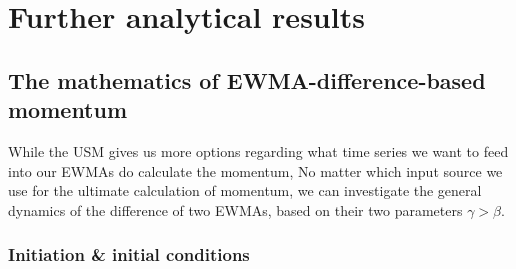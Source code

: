 \section*{Further analytical results}





\subsection{The mathematics of EWMA-difference-based momentum}

While the USM gives us more options regarding what time series we want to feed into our EWMAs do calculate the momentum,
No matter which input source we use for the ultimate calculation of momentum, we can investigate the general dynamics of the difference of two EWMAs, based on their two parameters $\gamma>\beta$.

\subsubsection{Initiation \& initial conditions}

